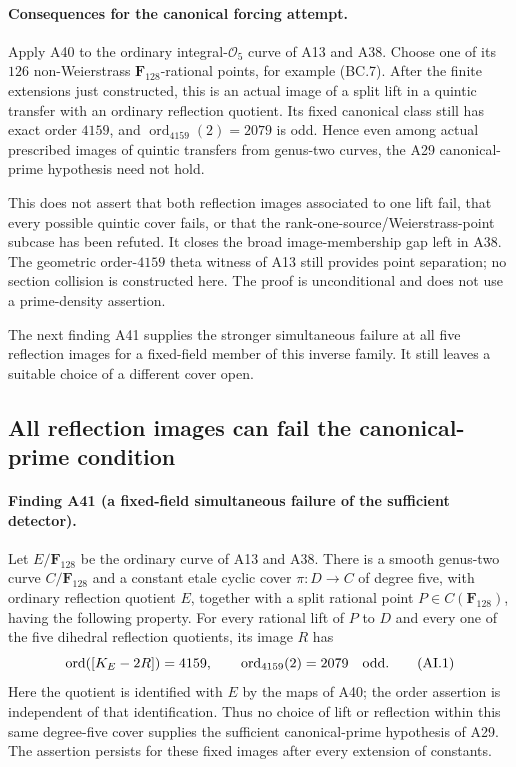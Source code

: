 \documentclass[11pt,a4paper]{article}
\begin{document}
\paragraph{Consequences for the canonical forcing attempt.}
Apply A40 to the ordinary integral-$\mathcal O_5$ curve of
A13 and A38. Choose one of its $126$ non-Weierstrass
$\mathbf F_{128}$-rational points, for example (BC.7).
After the finite extensions just constructed, this is an
actual image of a split lift in a quintic transfer with an
ordinary reflection quotient. Its fixed canonical class
still has exact order $4159$, and
$\operatorname{ord}_{4159}(2)=2079$ is odd. Hence even among
actual prescribed images of quintic transfers from genus-two
curves, the A29 canonical-prime hypothesis need not hold.

This does not assert that both reflection images associated
to one lift fail, that every possible quintic cover fails,
or that the rank-one-source/Weierstrass-point subcase has
been refuted. It closes the broad image-membership gap left
in A38. The geometric order-$4159$ theta witness of A13
still provides point separation; no section collision is
constructed here. The proof is unconditional and does not
use a prime-density assertion.

The next finding A41 supplies the stronger simultaneous failure at all
five reflection images for a fixed-field member of this inverse family.
It still leaves a suitable choice of a different cover open.


\subsection{All reflection images can fail the canonical-prime condition}

\paragraph{Finding A41 (a fixed-field simultaneous failure of the sufficient detector).}
Let $E/\mathbf F_{128}$ be the ordinary curve of A13 and A38.
There is a smooth genus-two curve $C/\mathbf F_{128}$ and a
constant etale cyclic cover $\pi:D\to C$ of degree five,
with ordinary reflection quotient $E$, together with a split
rational point $P\in C(\mathbf F_{128})$, having the following
property. For every rational lift of $P$ to $D$ and every
one of the five dihedral reflection quotients, its image
$R$ has
\[
                  \operatorname{ord}([K_E-2R])=4159,
             \qquad \operatorname{ord}_{4159}(2)=2079
                         \quad\hbox{odd}.
 \tag{AI.1}
\]
Here the quotient is identified with $E$ by the maps of A40;
the order assertion is independent of that identification.
Thus no choice of lift or reflection within this same
degree-five cover supplies the sufficient canonical-prime
hypothesis of A29. The assertion persists for these fixed
images after every extension of constants.
\end{document}
